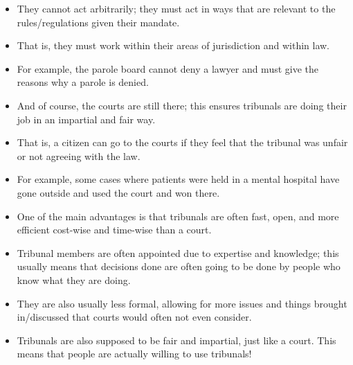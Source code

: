 \documentclass{article}
\begin{document}
\begin{itemize}
    \item They cannot act arbitrarily; they must act in ways that are relevant to the rules/regulations given their mandate.
    \item That is, they must work within their areas of jurisdiction and within law.
    \item For example, the parole board cannot deny a lawyer and must give the reasons why a parole is denied.
    \item And of course, the courts are still there; this ensures tribunals are doing their job in an impartial and fair way.
    \item That is, a citizen can go to the courts if they feel that the tribunal was unfair or not agreeing with the law.
    \item For example, some cases where patients were held in a mental hospital have gone outside and used the court and won there.
    \item One of the main advantages is that tribunals are often fast, open, and more efficient cost-wise and time-wise than a court.
    \item Tribunal members are often appointed due to expertise and knowledge; this usually means that decisions done are often going to be done by people who know what they are doing.
    \item They are also usually less formal, allowing for more issues and things brought in/discussed that courts would often not even consider.
    \item Tribunals are also supposed to be fair and impartial, just like a court.  This means that people are actually willing to use tribunals!
\end{itemize}
\end{document}
